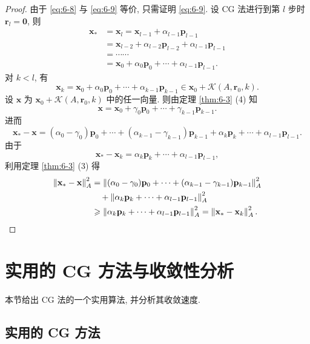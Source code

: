 \begin{proof}
由于 \eqref{eq:6-8} 与 \eqref{eq:6-9} 等价, 只需证明 \eqref{eq:6-9}. 设 CG 法进行到第 $l$ 步时 $\mathbf{r}_l=\mathbf{0}$, 则
\[
  \begin{aligned}
    \mathbf{x}_*&=\mathbf{x}_l=\mathbf{x}_{l-1}+\alpha_{l-1}\mathbf{p}_{l-1}\\
    &=\mathbf{x}_{l-2}+\alpha_{l-2}\mathbf{p}_{l-2}+\alpha_{l-1}\mathbf{p}_{l-1}\\
    &=\cdots\cdots\\
    &=\mathbf{x}_0+\alpha_0\mathbf{p}_0+\cdots+\alpha_{l-1}\mathbf{p}_{l-1}.
  \end{aligned}
\]
对 $k<l$, 有
\[
  \mathbf{x}_k=\mathbf{x}_0+\alpha_0\mathbf{p}_0+\cdots+\alpha_{k-1}\mathbf{p}_{k-1}
  \in\mathbf{x}_0+\mathcal{K}(A,\mathbf{r}_0,k).
\]
设 $\mathbf{x}$ 为 $\mathbf{x}_0+\mathcal{K}(A,\mathbf{r}_0,k)$ 中的任一向量. 则由定理 \ref{thm:6-3} (4) 知
\[
  \mathbf{x}=\mathbf{x}_0+\gamma_0\mathbf{p}_0+\cdots+\gamma_{k-1}\mathbf{p}_{k-1}.
\]
进而
\[
  \mathbf{x}_*-\mathbf{x}
  =(\alpha_0-\gamma_0)\mathbf{p}_0+\cdots
  +(\alpha_{k-1}-\gamma_{k-1})\mathbf{p}_{k-1}
  +\alpha_k\mathbf{p}_k+\cdots+\alpha_{l-1}\mathbf{p}_{l-1}.
\]
由于
\[
  \mathbf{x}_*-\mathbf{x}_k=\alpha_k\mathbf{p}_k+\cdots+\alpha_{l-1}\mathbf{p}_{l-1},
\]
利用定理 \ref{thm:6-3} (3) 得
\[
  \begin{aligned}
    \left\|\mathbf{x}_*-\mathbf{x}\right\|_A^2
    &=\left\|(\alpha_0-\gamma_0)\mathbf{p}_0+\cdots
      +(\alpha_{k-1}-\gamma_{k-1})\mathbf{p}_{k-1}\right\|_A^2\\
    &\quad+\left\|\alpha_k\mathbf{p}_k+\cdots
      +\alpha_{l-1}\mathbf{p}_{l-1}\right\|_A^2\\
    &\geqslant\left\|\alpha_k\mathbf{p}_k+\cdots
      +\alpha_{l-1}\mathbf{p}_{l-1}\right\|_A^2
     =\left\|\mathbf{x}_*-\mathbf{x}_k\right\|_A^2.
    \qedhere
  \end{aligned}
\]
\end{proof}

\section{实用的 CG 方法与收敛性分析}
\label{sec:6-3}

本节给出 CG 法的一个实用算法, 并分析其收敛速度.

\subsection{实用的 CG 方法}
\label{subsec:6-3-1}

